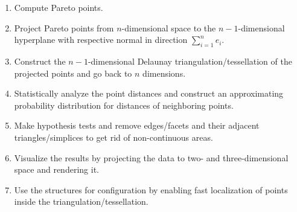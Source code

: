 \documentclass[10pt, twoside]{article}
\begin{document}
      \begin{enumerate}
        \item Compute Pareto points.
        \item Project Pareto points from $n$-dimensional space to the $n-1$-dimensional hyperplane with respective normal in direction $\sum_{i=1}^n e_i$.
        \item Construct the $n-1$-dimensional Delaunay triangulation/tessellation of the projected points and go back to $n$ dimensions.
        \item Statistically analyze the point distances and construct an approximating probability distribution for distances of neighboring points.
        \item Make hypothesis tests and remove edges/facets and their adjacent triangles/simplices to get rid of non-continuous areas.
        \item Visualize the results by projecting the data to two- and three-dimensional space and rendering it.
        \item Use the structures for configuration by enabling fast localization of points inside the triangulation/tessellation.
      \end{enumerate}
\end{document}
